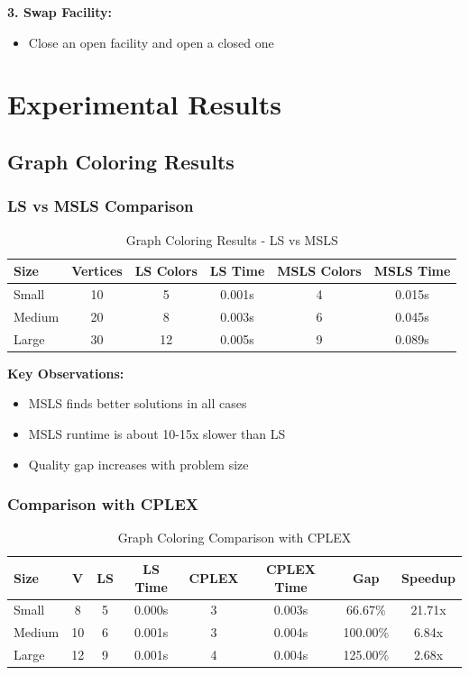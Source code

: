 \documentclass[12pt,a4paper]{article}
\begin{document}
\textbf{3. Swap Facility:}
\begin{itemize}
    \item Close an open facility and open a closed one
\end{itemize}

\section{Experimental Results}

\subsection{Graph Coloring Results}

\subsubsection{LS vs MSLS Comparison}

\begin{table}[h]
\centering
\caption{Graph Coloring Results - LS vs MSLS}
\begin{tabular}{|l|c|c|c|c|c|}
\hline
\textbf{Size} & \textbf{Vertices} & \textbf{LS Colors} & \textbf{LS Time} & \textbf{MSLS Colors} & \textbf{MSLS Time} \\
\hline
Small & 10 & 5 & 0.001s & 4 & 0.015s \\
Medium & 20 & 8 & 0.003s & 6 & 0.045s \\
Large & 30 & 12 & 0.005s & 9 & 0.089s \\
\hline
\end{tabular}
\end{table}

\textbf{Key Observations:}
\begin{itemize}
    \item MSLS finds better solutions in all cases
    \item MSLS runtime is about 10-15x slower than LS
    \item Quality gap increases with problem size
\end{itemize}

\subsubsection{Comparison with CPLEX}

\begin{table}[h]
\centering
\caption{Graph Coloring Comparison with CPLEX}
\begin{tabular}{|l|c|c|c|c|c|c|c|}
\hline
\textbf{Size} & \textbf{V} & \textbf{LS} & \textbf{LS Time} & \textbf{CPLEX} & \textbf{CPLEX Time} & \textbf{Gap} & \textbf{Speedup} \\
\hline
Small & 8 & 5 & 0.000s & 3 & 0.003s & 66.67\% & 21.71x \\
Medium & 10 & 6 & 0.001s & 3 & 0.004s & 100.00\% & 6.84x \\
Large & 12 & 9 & 0.001s & 4 & 0.004s & 125.00\% & 2.68x \\
\hline
\end{tabular}
\end{table}
\end{document}
